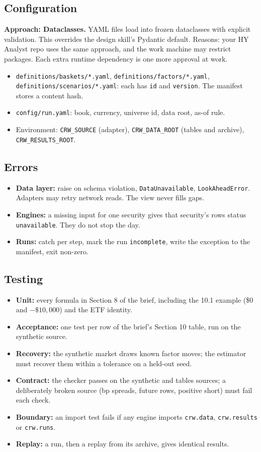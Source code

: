 \documentclass[11pt,a4paper]{article}
\newcommand{\code}[1]{\texttt{\small #1}}
\begin{document}
\subsection{Configuration}\label{sec:config}
\textbf{Approach: Dataclasses.} YAML files load into frozen dataclasses with explicit validation. This overrides the design skill's Pydantic default. Reasons: your HY Analyst repo uses the same approach, and the work machine may restrict packages. Each extra runtime dependency is one more approval at work.
\begin{itemize}
\item \code{definitions/baskets/*.yaml}, \code{definitions/factors/*.yaml}, \code{definitions/scenarios/*.yaml}: each has \code{id} and \code{version}. The manifest stores a content hash.
\item \code{config/run.yaml}: book, currency, universe id, data root, as-of rule.
\item Environment: \code{CRW\_SOURCE} (adapter), \code{CRW\_DATA\_ROOT} (tables and archive), \code{CRW\_RESULTS\_ROOT}.
\end{itemize}

\subsection{Errors}
\begin{itemize}
\item \textbf{Data layer:} raise on schema violation, \code{DataUnavailable}, \code{LookAheadError}. Adapters may retry network reads. The view never fills gaps.
\item \textbf{Engines:} a missing input for one security gives that security's rows status \code{unavailable}. They do not stop the day.
\item \textbf{Runs:} catch per step, mark the run \code{incomplete}, write the exception to the manifest, exit non-zero.
\end{itemize}

\subsection{Testing}
\begin{itemize}
\item \textbf{Unit:} every formula in Section 8 of the brief, including the 10.1 example (\$0 and $-\$10{,}000$) and the ETF identity.
\item \textbf{Acceptance:} one test per row of the brief's Section 10 table, run on the synthetic source.
\item \textbf{Recovery:} the synthetic market draws known factor moves; the estimator must recover them within a tolerance on a held-out seed.
\item \textbf{Contract:} the checker passes on the synthetic and tables sources; a deliberately broken source (bp spreads, future rows, positive short) must fail each check.
\item \textbf{Boundary:} an import test fails if any engine imports \code{crw.data}, \code{crw.results} or \code{crw.runs}.
\item \textbf{Replay:} a run, then a replay from its archive, gives identical results.
\end{itemize}
\end{document}
